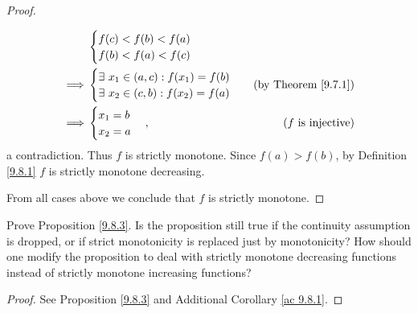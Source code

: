 \begin{proof}
\begin{itemize}
\begin{align*}
                           & \begin{cases}
                      f(c) < f(b) < f(a) \\
                      f(b) < f(a) < f(c)
                  \end{cases}                                    \\
                  \implies & \begin{cases}
                      \exists\ x_1 \in (a, c) : f(x_1) = f(b) \\
                      \exists\ x_2 \in (c, b) : f(x_2) = f(a) \\
                  \end{cases}  & \text{(by Theorem \ref{9.7.1})} \\
                  \implies & \begin{cases}
                      x_1 = b \\
                      x_2 = a
                  \end{cases}, & \text{(\(f\) is injective)}
              \end{align*}
              a contradiction.
              Thus \(f\) is strictly monotone.
              Since \(f(a) > f(b)\), by Definition \ref{9.8.1} \(f\) is strictly monotone decreasing.
    \end{itemize}
    From all cases above we conclude that \(f\) is strictly monotone.
\end{proof}

\begin{exercise}\label{ex 9.8.4}
    Prove Proposition \ref{9.8.3}.
    Is the proposition still true if the continuity assumption is dropped, or if strict monotonicity is replaced just by monotonicity?
    How should one modify the proposition to deal with strictly monotone decreasing functions instead of strictly monotone increasing functions?
\end{exercise}

\begin{proof}
    See Proposition \ref{9.8.3} and Additional Corollary \ref{ac 9.8.1}.
\end{proof}

